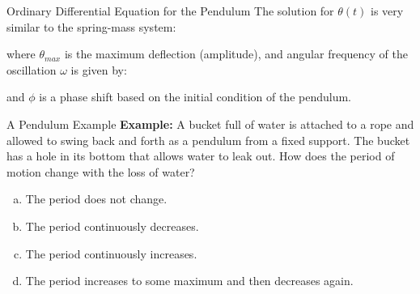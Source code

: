 \documentclass[12pt,compress,aspectratio=169]{beamer}
\newcommand{\eq}[2]{\vspace{#1}{\Large\begin{displaymath}#2\end{displaymath}}}
\begin{document}
\begin{frame}{Ordinary Differential Equation for the Pendulum}
  The solution for $\theta(t)$ is very similar to the spring-mass system:

    \eq{-.2in}{
      \boxed{\theta(t)=\theta_{max}\cos(\omega t-\phi)}
    }

    where $\theta_{max}$ is the maximum deflection (amplitude), and angular
    frequency of the oscillation $\omega$ is given by:
    
    \eq{-.15in}{
      \boxed{\omega=\sqrt{\frac{g}{L}}}
    }

    and $\phi$ is a phase shift based on the initial condition of the pendulum.
\end{frame}






\begin{frame}{A Pendulum Example}
  \textbf{Example:} A bucket full of water is attached to a rope and allowed
  to swing back and forth as a pendulum from a fixed support. The bucket has a
  hole in its bottom that allows water to leak out. How does the period of
  motion change with the loss of water?
  \begin{enumerate}[(a)]
  \item The period does not change.
  \item The period continuously decreases.
  \item The period continuously increases.
  \item The period increases to some maximum and then decreases again.
  \end{enumerate}
\end{frame}
\end{document}
